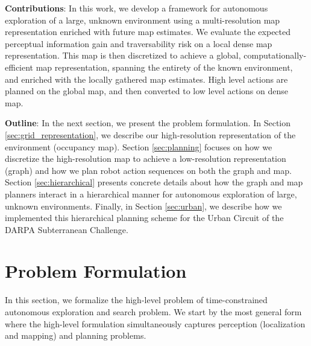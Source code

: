 \documentclass[letterpaper, 10 pt, conference]{ieeeconf}  %
\newcommand{\ph}[1]{{\textbf{#1}:}} %
\begin{document}
\ph{Contributions}
In this work, we develop a framework for autonomous exploration of a large, unknown environment using a multi-resolution map representation enriched with future map estimates. We evaluate the expected perceptual information gain and traversability risk on a local dense map representation. This map is then discretized to achieve a global, computationally-efficient map representation, spanning the entirety of the known environment, and enriched with the locally gathered map estimates. High level actions are planned on the global map, and then converted to low level actions on dense map.    

\ph{Outline}
In the next section, we present the problem formulation. In Section \ref{sec:grid_representation}, we describe our high-resolution representation of the environment (occupancy map). Section \ref{sec:planning} focuses on how we discretize the high-resolution map to achieve a low-resolution representation (graph) and how we plan robot action sequences on both the graph and map. Section \ref{sec:hierarchical} presents concrete details about how the graph and map planners interact in a hierarchical manner for autonomous exploration of large, unknown environments. Finally, in Section \ref{sec:urban}, we describe how we implemented this hierarchical planning scheme for the Urban Circuit of the DARPA Subterranean Challenge.



\section{Problem Formulation}
In this section, we formalize the high-level problem of time-constrained autonomous exploration and search problem.
We start by the most general form where the high-level formulation simultaneously captures perception (localization and mapping) and planning problems.
\end{document}
